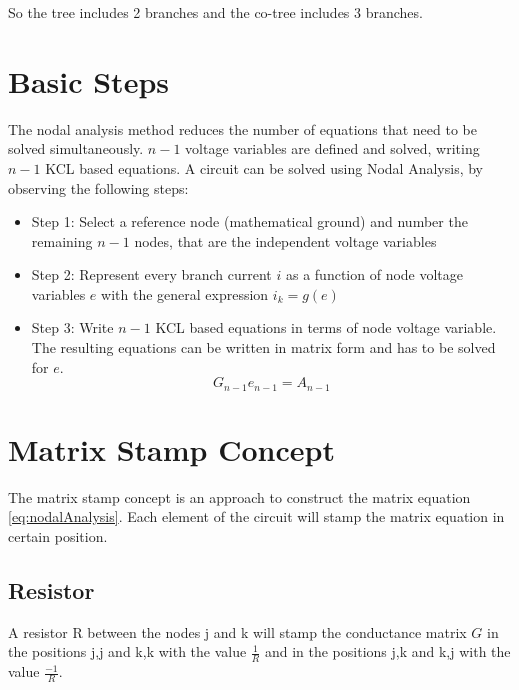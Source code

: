 So the tree includes 2 branches and the co-tree includes 3 branches.

\section{Basic Steps}
The nodal analysis method reduces the number of equations that need to be solved simultaneously. $n-1$ voltage variables are defined and solved, writing $n-1$ KCL based equations. 
A circuit can be solved using Nodal Analysis, by observing the following steps:

\begin{itemize}
\item Step 1: Select a reference node (mathematical ground) and number the remaining $n-1$ nodes, that are the independent voltage variables
\item Step 2: Represent every branch current $i$ as a function of node voltage variables $e$ with the general expression $i_k = g(e)$
\item Step 3: Write $n-1$ KCL based equations in terms of node voltage variable. The resulting equations can be written in matrix form and has to be solved for $e$.
\begin{equation} \label{eq:nodalAnalysis}
G_{n-1}e_{n-1} =  A_{n-1}
\end{equation}
\end{itemize}

\section{Matrix Stamp Concept}
The matrix stamp concept is an approach to construct the matrix equation \ref{eq:nodalAnalysis}. Each element of the circuit will stamp the matrix equation in certain position.

\subsection{Resistor}
A resistor R between the nodes j and k will stamp the conductance matrix $G$ in the positions j,j and k,k with the value $\frac{1}{R} $ and in the positions j,k and k,j with the value $\frac{-1}{R} $.

